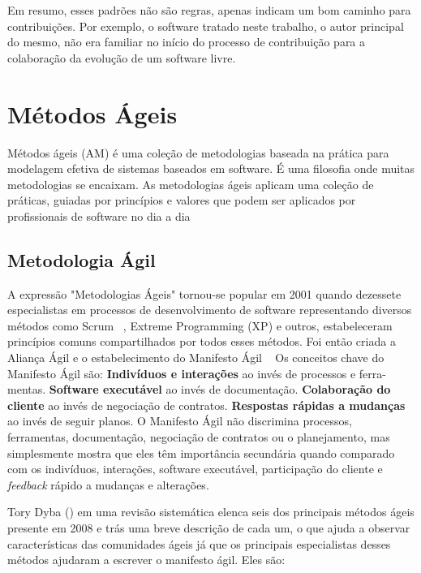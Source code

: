 
Em resumo, esses padrões não são regras, apenas indicam um bom caminho para contribuições. Por exemplo, o software tratado neste trabalho, o autor principal do mesmo, não era familiar no início do processo de contribuição para a colaboração da evolução de um software livre.

\section{Métodos Ágeis}
\label{sec-metedos-ageis}

Métodos ágeis (AM) é uma coleção de metodologias baseada na prática para modelagem efetiva de sistemas baseados em software. É uma filosofia onde muitas metodologias se encaixam. As metodologias ágeis aplicam uma coleção de práticas, guiadas por princípios e valores que podem ser aplicados por profissionais de software no dia a dia~\cite{manifesto2001}%

\subsection{Metodologia Ágil}
\label{metodologia-agil}

A expressão "Metodologias Ágeis" tornou-se popular em 2001 quando dezessete especialistas em processos de desenvolvimento de software representando diversos métodos como Scrum ~\cite{schwaber2002},
Extreme Programming (XP) e outros, estabeleceram princípios comuns compartilhados por todos esses métodos. Foi então criada a Aliança Ágil e o estabelecimento do Manifesto Ágil ~\cite{manifesto2001}
Os conceitos chave do Manifesto Ágil são:
\textbf{Indivíduos e interações} ao invés de processos e ferra-
mentas.
\textbf{Software executável} ao invés de documentação.
\textbf{Colaboração do cliente} ao invés de negociação de contratos.
\textbf{Respostas rápidas a mudanças} ao invés de seguir planos.
O Manifesto Ágil não discrimina processos, ferramentas, documentação, negociação de contratos ou o planejamento, mas simplesmente mostra que eles têm importância secundária quando comparado com os indivíduos, interações, software executável, participação do cliente e \textit{feedback} rápido a mudanças e alterações.

%
Tory Dyba (\citeyear{dyba2008}) em uma revisão sistemática elenca seis dos principais métodos ágeis presente em 2008 e trás uma breve descrição de cada um, o que ajuda a observar características das comunidades ágeis já que os principais especialistas desses métodos ajudaram a escrever o manifesto ágil. Eles são:

